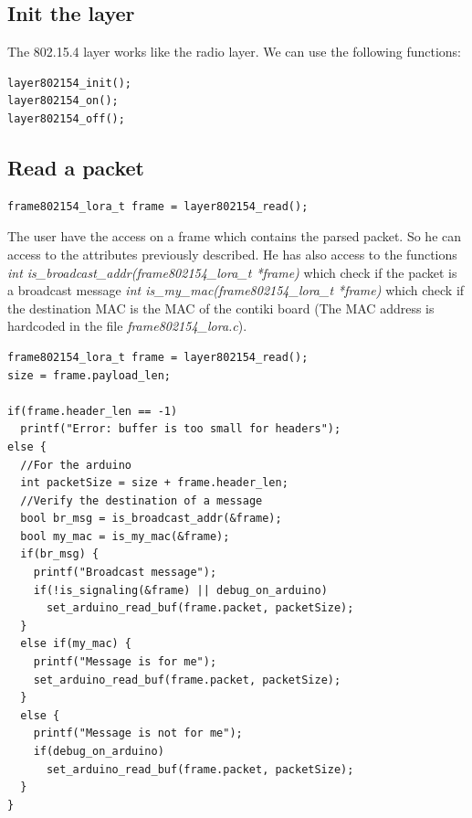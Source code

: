 \documentclass{article}
\begin{document}
\subsection{Init the layer}
The 802.15.4 layer works like the radio layer. We can use the following functions:
\begin{verbatim}
layer802154_init();
layer802154_on();
layer802154_off();
\end{verbatim}
\subsection{Read a packet}
\begin{verbatim}
frame802154_lora_t frame = layer802154_read();
\end{verbatim}
The user have the access on a frame which contains the parsed packet. So he can access to the attributes previously described. He has also access to the functions\\\emph{int is\_broadcast\_addr(frame802154\_lora\_t *frame)} which check if the packet is a broadcast message \emph{int is\_my\_mac(frame802154\_lora\_t *frame)} which check if the destination MAC is the MAC of the contiki board (The MAC address is hardcoded in the file \emph{frame802154\_lora.c}).
\begin{verbatim}
frame802154_lora_t frame = layer802154_read();
size = frame.payload_len;

if(frame.header_len == -1)
  printf("Error: buffer is too small for headers");
else {
  //For the arduino
  int packetSize = size + frame.header_len;
  //Verify the destination of a message
  bool br_msg = is_broadcast_addr(&frame);
  bool my_mac = is_my_mac(&frame);
  if(br_msg) {
    printf("Broadcast message");
    if(!is_signaling(&frame) || debug_on_arduino)
      set_arduino_read_buf(frame.packet, packetSize);
  }
  else if(my_mac) {
    printf("Message is for me");
    set_arduino_read_buf(frame.packet, packetSize);
  }
  else {
    printf("Message is not for me");
    if(debug_on_arduino)
      set_arduino_read_buf(frame.packet, packetSize);
  }
}
\end{verbatim}
\end{document}
